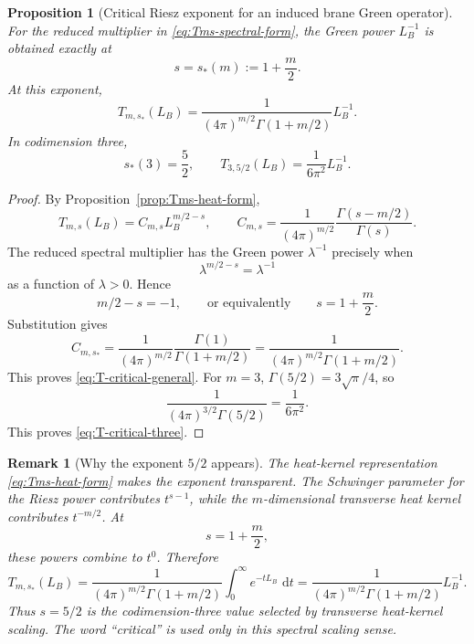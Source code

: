 \documentclass[11pt]{article}
\newtheorem{proposition}[theorem]{Proposition}
\newtheorem{remark}[theorem]{Remark}
\newcommand{\dd}{\,\mathrm{d}}
\begin{document}
\begin{proposition}[Critical Riesz exponent for an induced brane Green operator]
\label{prop:critical-riesz-exponent}
For the reduced multiplier in \eqref{eq:Tms-spectral-form}, the Green
power \(L_B^{-1}\) is obtained exactly at
\begin{equation}
    s=s_\ast(m):=1+\frac m2 .
    \label{eq:critical-riesz-exponent}
\end{equation}
At this exponent,
\begin{equation}
    T_{m,s_\ast}(L_B)
    =
    \frac{1}{(4\pi)^{m/2}\Gamma(1+m/2)}
    L_B^{-1}.
    \label{eq:T-critical-general}
\end{equation}
In codimension three,
\begin{equation}
    s_\ast(3)=\frac52,
    \qquad
    T_{3,5/2}(L_B)
    =
    \frac{1}{6\pi^2}L_B^{-1}.
    \label{eq:T-critical-three}
\end{equation}
\end{proposition}

\begin{proof}
By Proposition~\ref{prop:Tms-heat-form},
\[
    T_{m,s}(L_B)
    =
    C_{m,s}L_B^{m/2-s},
    \qquad
    C_{m,s}
    =
    \frac{1}{(4\pi)^{m/2}}
    \frac{\Gamma(s-m/2)}{\Gamma(s)} .
\]
The reduced spectral multiplier has the Green power \(\lambda^{-1}\)
precisely when
\[
    \lambda^{m/2-s}=\lambda^{-1}
\]
as a function of \(\lambda>0\).  Hence
\[
    m/2-s=-1,
    \qquad\text{or equivalently}\qquad
    s=1+\frac m2 .
\]
Substitution gives
\[
    C_{m,s_\ast}
    =
    \frac{1}{(4\pi)^{m/2}}
    \frac{\Gamma(1)}{\Gamma(1+m/2)}
    =
    \frac{1}{(4\pi)^{m/2}\Gamma(1+m/2)}.
\]
This proves \eqref{eq:T-critical-general}.  For \(m=3\),
\(\Gamma(5/2)=3\sqrt{\pi}/4\), so
\[
    \frac{1}{(4\pi)^{3/2}\Gamma(5/2)}
    =
    \frac{1}{6\pi^2}.
\]
This proves \eqref{eq:T-critical-three}.
\end{proof}

\begin{remark}[Why the exponent \(5/2\) appears]
The heat-kernel representation \eqref{eq:Tms-heat-form} makes the exponent
transparent.  The Schwinger parameter for the Riesz power contributes
\(t^{s-1}\), while the \(m\)-dimensional transverse heat kernel contributes
\(t^{-m/2}\).  At
\[
    s=1+\frac m2,
\]
these powers combine to \(t^0\).  Therefore
\[
    T_{m,s_\ast}(L_B)
    =
    \frac{1}{(4\pi)^{m/2}\Gamma(1+m/2)}
    \int_0^\infty e^{-tL_B}\,\dd t
    =
    \frac{1}{(4\pi)^{m/2}\Gamma(1+m/2)}
    L_B^{-1}.
\]
Thus \(s=5/2\) is the codimension-three value selected by transverse
heat-kernel scaling.  The word ``critical'' is used only in this spectral
scaling sense.
\end{remark}
\end{document}
